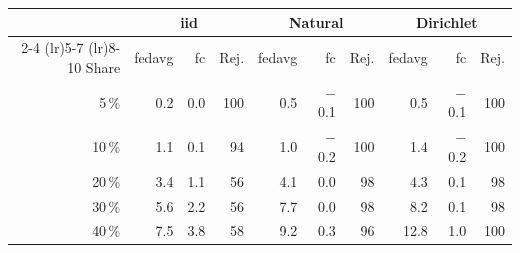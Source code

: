 \begin{tabular}{rrrrrrrrrr}
\toprule
 & \multicolumn{3}{c}{\gls{iid}} & \multicolumn{3}{c}{Natural} & \multicolumn{3}{c}{Dirichlet} \\
\cmidrule(lr){2-4} \cmidrule(lr){5-7} \cmidrule(lr){8-10}
Share & \gls{fedavg} & \gls{fc} & Rej. & \gls{fedavg} & \gls{fc} & Rej. & \gls{fedavg} & \gls{fc} & Rej. \\
\midrule
5\,\% & 0.2 & 0.0 & 100 & 0.5 & $-$0.1 & 100 & 0.5 & $-$0.1 & 100 \\
10\,\% & 1.1 & 0.1 & 94 & 1.0 & $-$0.2 & 100 & 1.4 & $-$0.2 & 100 \\
20\,\% & 3.4 & 1.1 & 56 & 4.1 & 0.0 & 98 & 4.3 & 0.1 & 98 \\
30\,\% & 5.6 & 2.2 & 56 & 7.7 & 0.0 & 98 & 8.2 & 0.1 & 98 \\
40\,\% & 7.5 & 3.8 & 58 & 9.2 & 0.3 & 96 & 12.8 & 1.0 & 100 \\
\bottomrule
\end{tabular}
